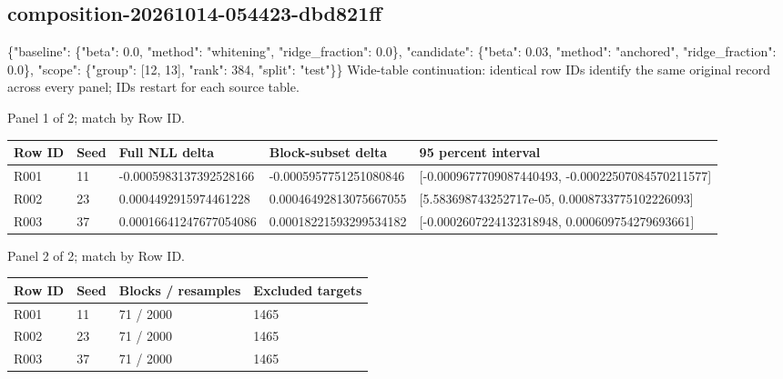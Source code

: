 \documentclass[10pt]{article}
\begin{document}
\subsection{composition-20261014-054423-dbd821ff}
\{"baseline": \{"beta": 0.0, "method": "whitening", "ridge\_fraction": 0.0\}, "candidate": \{"beta": 0.03, "method": "anchored", "ridge\_fraction": 0.0\}, "scope": \{"group": [12, 13], "rank": 384, "split": "test"\}\}
Wide-table continuation: identical row IDs identify the same original record across every panel; IDs restart for each source table.
\par\noindent Panel 1 of 2; match by Row ID.
{\scriptsize\setlength{\tabcolsep}{2pt}
\begin{longtable}{p{}p{}p{}p{}p{}}
Row ID & Seed & Full NLL delta & Block-subset delta & 95 percent interval \\
\hline\endhead
R001 & 11 & -0.0005983137392528166 & -0.0005957751251080846 & [-0.0009677709087440493, -0.00022507084570211577] \\
R002 & 23 & 0.0004492915974461228 & 0.00046492813075667055 & [5.583698743252717e-05, 0.0008733775102226093] \\
R003 & 37 & 0.00016641247677054086 & 0.00018221593299534182 & [-0.0002607224132318948, 0.000609754279693661] \\
\end{longtable}}
\par\noindent Panel 2 of 2; match by Row ID.
{\scriptsize\setlength{\tabcolsep}{2pt}
\begin{longtable}{p{}p{}p{}p{}}
Row ID & Seed & Blocks / resamples & Excluded targets \\
\hline\endhead
R001 & 11 & 71 / 2000 & 1465 \\
R002 & 23 & 71 / 2000 & 1465 \\
R003 & 37 & 71 / 2000 & 1465 \\
\end{longtable}}
\end{document}
